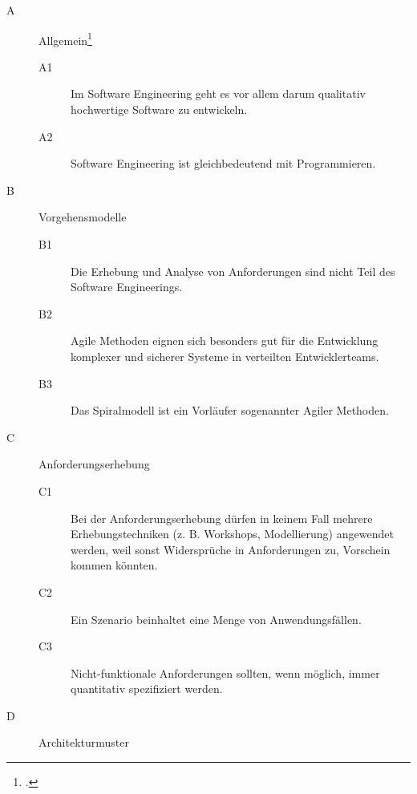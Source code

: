 \documentclass{lehramt-informatik}
\begin{document}
\begin{description}

%

\item[A] Allgemein\footcite[Herbst 2016 (66116) - Thema 2, Teilaufgabe 2, Aufgabe 1a]{examen:66116:2016:09}

\begin{description}
\item[A1] Im Software Engineering geht es vor allem darum qualitativ
hochwertige Software zu entwickeln.

\item[A2] Software Engineering ist gleichbedeutend mit Programmieren.
\end{description}

%

\item[B] Vorgehensmodelle

\begin{description}
\item[B1] Die Erhebung und Analyse von Anforderungen sind nicht Teil des
Software Engineerings.

\item[B2] Agile Methoden eignen sich besonders gut für die Entwicklung
komplexer und sicherer Systeme in verteilten Entwicklerteams.

\item[B3] Das Spiralmodell ist ein Vorläufer sogenannter Agiler
Methoden.
\end{description}

%

\item[C] Anforderungserhebung

\begin{description}
\item[C1] Bei der Anforderungserhebung dürfen in keinem Fall mehrere
Erhebungstechniken (z. B. Workshops, Modellierung) angewendet werden,
weil sonst Widersprüche in Anforderungen zu, Vorschein kommen könnten.

\item[C2] Ein Szenario beinhaltet eine Menge von Anwendungsfällen.

\item[C3] Nicht-funktionale Anforderungen sollten, wenn möglich, immer
quantitativ spezifiziert werden.
\end{description}

%

\item[D] Architekturmuster


\end{description}
\end{document}
